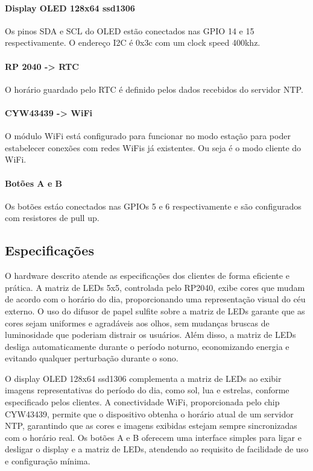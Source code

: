 \documentclass[12pt]{article}
\begin{document}
\paragraph{Display OLED 128x64 ssd1306}
Os pinos SDA e SCL do OLED estão conectados nas GPIO 14 e 15 respectivamente. O endereço I2C é 0x3c com um clock speed 400khz.

\paragraph{RP 2040 -> RTC}
O horário guardado pelo RTC é definido pelos dados recebidos do servidor NTP.

\paragraph{CYW43439 -> WiFi}
O módulo WiFi está configurado para funcionar no modo estação para poder estabelecer conexões com redes WiFis já existentes. Ou seja é o modo cliente do WiFi.

\paragraph{Botões A e B}
Os botões estáo conectados nas GPIOs 5 e 6 respectivamente e são configurados com resistores de pull up.

\subsection{Especificações}

O hardware descrito atende as especificações dos clientes de forma eficiente e prática. A matriz de LEDs 5x5, controlada pelo RP2040, exibe cores que mudam de acordo com o horário do dia, proporcionando uma representação visual do céu externo. O uso do difusor de papel sulfite sobre a matriz de LEDs garante que as cores sejam uniformes e agradáveis aos olhos, sem mudanças bruscas de luminosidade que poderiam distrair os usuários. Além disso, a matriz de LEDs desliga automaticamente durante o período noturno, economizando energia e evitando qualquer perturbação durante o sono.

O display OLED 128x64 ssd1306 complementa a matriz de LEDs ao exibir imagens representativas do período do dia, como sol, lua e estrelas, conforme especificado pelos clientes. A conectividade WiFi, proporcionada pelo chip CYW43439, permite que o dispositivo obtenha o horário atual de um servidor NTP, garantindo que as cores e imagens exibidas estejam sempre sincronizadas com o horário real. Os botões A e B oferecem uma interface simples para ligar e desligar o display e a matriz de LEDs, atendendo ao requisito de facilidade de uso e configuração mínima.
\end{document}
